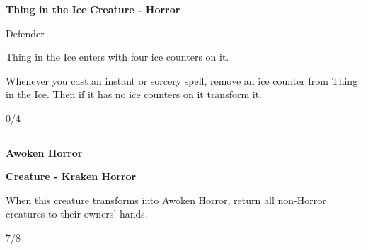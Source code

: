 \documentclass[8pt]{extarticle}
\begin{document}
{\large\textbf{Thing in the Ice}}
\hfill
\1\U

\textbf{Creature - Horror}

Defender

Thing in the Ice enters with four ice counters on it.

Whenever you cast an instant or sorcery spell, remove an ice counter from Thing in the Ice.
Then if it has no ice counters on it transform it.

\hfill 0/4

\vfill
\hrule
\vfill

{\large\textbf{Awoken Horror}}

\textbf{Creature - Kraken Horror}

When this creature transforms into Awoken Horror, return all non-Horror creatures to their owners' hands.

\hfill 7/8
\end{document}
